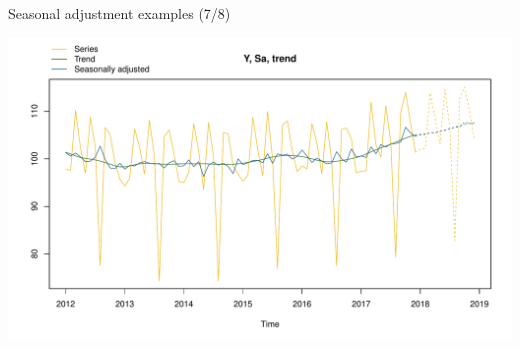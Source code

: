 \documentclass[10pt,xcolor=table,color={dvipsnames,usenames},ignorenonframetext,usepdftitle=false,french]{beamer}
\newenvironment{Shaded}{\begin{snugshade}}{\end{snugshade}}
\newcommand{\DataTypeTok}[1]{\textcolor[rgb]{0.13,0.29,0.53}{#1}}
\newcommand{\DecValTok}[1]{\textcolor[rgb]{0.00,0.00,0.81}{#1}}
\newcommand{\KeywordTok}[1]{\textcolor[rgb]{0.13,0.29,0.53}{\textbf{#1}}}
\newcommand{\NormalTok}[1]{#1}
\newcommand{\OperatorTok}[1]{\textcolor[rgb]{0.81,0.36,0.00}{\textbf{#1}}}
\newcommand{\StringTok}[1]{\textcolor[rgb]{0.31,0.60,0.02}{#1}}
\begin{document}
\begin{frame}[fragile]{Seasonal adjustment examples (7/8)}
\protect\hypertarget{seasonal-adjustment-examples-78}{}

\begin{Shaded}
\end{Shaded}

\includegraphics{img/markdown-unnamed-chunk-11-1.pdf}

\end{frame}
\end{document}
